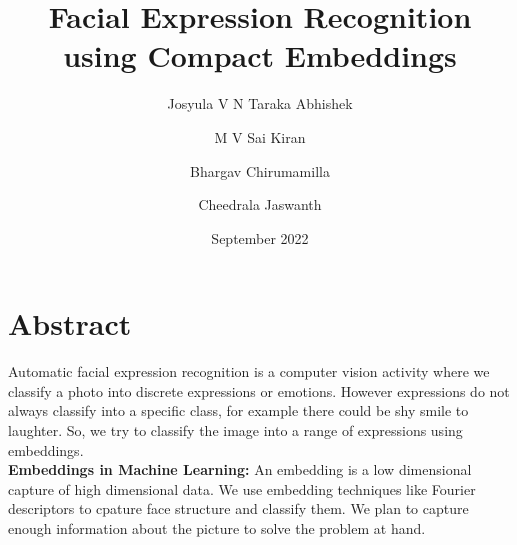 \documentclass{article}
\title{Facial Expression Recognition using Compact Embeddings}
\author{Josyula V N Taraka Abhishek \\
        \and 
        M V Sai Kiran  \\
        \and 
        Bhargav Chirumamilla \\
        \and
        Cheedrala Jaswanth \\
}
\date{September 2022}
\begin{document}
\maketitle

\section{Abstract}
Automatic facial expression recognition is a computer vision activity where we classify a photo into discrete expressions or emotions. However expressions do not always classify into
a specific class, for example there could be shy smile to laughter. So, we try to classify the image into a range of expressions using embeddings.
\\

\textbf{Embeddings in Machine Learning:}
An embedding is a low dimensional capture of high dimensional data. We use embedding techniques like Fourier descriptors to cpature face structure and classify them.
We plan to capture enough information about the picture to solve the problem at hand.
\end{document}
